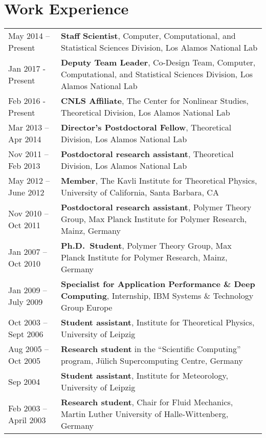 \documentclass{article}
\begin{document}
\section*{Work Experience}
\begin{tabular}{p{}p{}}
May 2014 -- Present & \textbf{Staff Scientist}, Computer, Computational, and Statistical Sciences Division, Los Alamos National Lab\\
Jan 2017 - Present & \textbf{Deputy Team Leader}, Co-Design Team, Computer, Computational, and Statistical Sciences Division, Los Alamos National Lab \\
Feb 2016 - Present & \textbf{CNLS Affiliate}, The Center for Nonlinear Studies, Theoretical Division, Los Alamos National Lab \\
Mar 2013 -- Apr 2014 & \textbf{Director's Postdoctoral Fellow}, Theoretical Division, Los Alamos National Lab\\
Nov 2011 -- Feb 2013 & \textbf{Postdoctoral research assistant}, Theoretical Division, Los Alamos National Lab\\
May 2012 -- June 2012 & \textbf{Member}, The Kavli Institute for Theoretical Physics, University of California, Santa Barbara, CA \\
Nov 2010 -- Oct 2011 & \textbf{Postdoctoral research assistant}, Polymer Theory Group, Max Planck Institute for Polymer Research, Mainz, Germany\\
Jan 2007 -- Oct 2010 & \textbf{Ph.D.\ Student}, Polymer Theory Group, Max Planck Institute for Polymer Research, Mainz, Germany\\
Jan 2009 -- July 2009 & \textbf{Specialist for Application Performance \& Deep Computing}, Internship, IBM Systems \& Technology Group Europe \\
Oct 2003 -- Sept 2006 & \textbf{Student assistant}, Institute for Theoretical Physics, University of Leipzig \\
Aug 2005 -- Oct 2005 & \textbf{Research student} in the ``Scientific Computing'' program, J{\"u}lich Supercomputing Centre, Germany \\
Sep 2004 & \textbf{Student assistant}, Institute for Meteorology, University of Leipzig \\
Feb 2003 -- April 2003 & \textbf{Research student}, Chair for Fluid Mechanics, Martin Luther University of Halle-Wittenberg, Germany \\
\end{tabular}

\vspace{-2mm}
\end{document}
